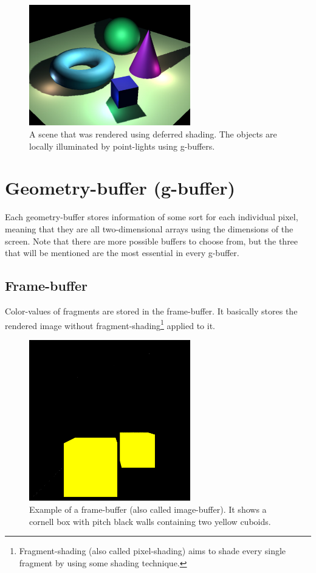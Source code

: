 \documentclass{ACGSeminar}
\begin{document}
		\begin{figure}[htb!]%
		\begin{center}%
			\includegraphics[width=7cm]{img/wiki_deferred_shading.png}
		\end{center}%
		\caption{A scene that was rendered using deferred shading. The objects are locally illuminated by point-lights using g-buffers.}%
		\label{fig:deferred_shading}%
		\end{figure}%

\section{Geometry-buffer (g-buffer)}
	Each geometry-buffer stores information of some sort for each individual pixel, meaning that they are all two-dimensional arrays using the dimensions of the screen. Note that there are more possible buffers to choose from, but the three that will be mentioned are the most essential in every g-buffer.
	\subsection{Frame-buffer}%
		Color-values of fragments are stored in the frame-buffer. It basically stores the rendered image without fragment-shading\footnote{Fragment-shading (also called pixel-shading) aims to shade every single fragment by using some shading technique.} applied to it.%
		\begin{figure}[htb!]%
			\begin{center}%
				\includegraphics[width=7cm]{img/frame_buffer.png}
			\end{center}%
			\caption{Example of a frame-buffer (also called image-buffer). It shows a cornell box with pitch black walls containing two yellow cuboids.}%
			\label{fig:frame_buffer}
		\end{figure}%
\end{document}

